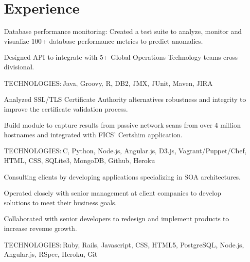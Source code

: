 \documentclass[]{cls}
\def\kt{\vspace*{2pt}\textsc{TECHNOLOGIES:\,}}
\begin{document}
\begin{minipage}[t]{0.66\textwidth} 


\section{Experience}
\sectionsep

\vspace{\topsep}
\begin{tightemize}
\item Database performance monitoring: Created a test suite to analyze, monitor and visualize 100+ database performance metrics to predict anomalies.
\item Designed API to integrate with 5+ Global Operations Technology teams cross-divisional.
\end{tightemize}
\kt Java, Groovy, R, DB2, JMX, JUnit, Maven, JIRA

\sectionsep


\begin{tightemize}
\item Analyzed SSL/TLS Certificate Authority alternatives robustness and integrity to improve the certificate validation process.
\item Build module to capture results from passive network scans from over 4 million hostnames and integrated with FICS' Certshim application.
\end{tightemize}
\kt C, Python, Node.js, Angular.js, D3.js, Vagrant/Puppet/Chef, HTML, CSS, SQLite3, MongoDB, Github, Heroku

\sectionsep

\begin{tightemize}
\item Consulting clients by developing applications specializing in SOA architectures. 
\item Operated closely with senior management at client companies to develop solutions to meet their business goals.
\item Collaborated with senior developers to redesign and implement products to increase revenue growth.
\end{tightemize}
\kt Ruby, Rails, Javascript, CSS, HTML5, PostgreSQL, Node.js, Angular.js, RSpec, Heroku, Git


\end{minipage}
\end{document}
